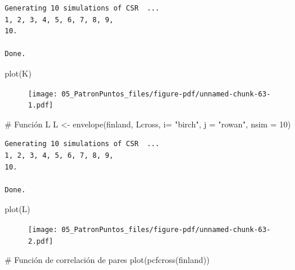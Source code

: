 \documentclass[
  letterpaper,
  DIV=11,
  numbers=noendperiod]{scrreprt}
\newenvironment{Shaded}{\begin{snugshade}}{\end{snugshade}}
\newcommand{\AttributeTok}[1]{\textcolor[rgb]{0.40,0.45,0.13}{#1}}
\newcommand{\CommentTok}[1]{\textcolor[rgb]{0.37,0.37,0.37}{#1}}
\newcommand{\DecValTok}[1]{\textcolor[rgb]{0.68,0.00,0.00}{#1}}
\newcommand{\FunctionTok}[1]{\textcolor[rgb]{0.28,0.35,0.67}{#1}}
\newcommand{\NormalTok}[1]{\textcolor[rgb]{0.00,0.23,0.31}{#1}}
\newcommand{\OtherTok}[1]{\textcolor[rgb]{0.00,0.23,0.31}{#1}}
\newcommand{\StringTok}[1]{\textcolor[rgb]{0.13,0.47,0.30}{#1}}
\begin{document}
\begin{verbatim}
Generating 10 simulations of CSR  ...
1, 2, 3, 4, 5, 6, 7, 8, 9, 
10.

Done.
\end{verbatim}

\begin{Shaded}
\begin{Highlighting}[]
\FunctionTok{plot}\NormalTok{(K)}
\end{Highlighting}
\end{Shaded}

\begin{figure}[H]

{\centering \texttt{[image: 05\_PatronPuntos\_files/figure-pdf/unnamed-chunk-63-1.pdf]}

}

\end{figure}

\begin{Shaded}
\begin{Highlighting}[]
\CommentTok{\# Función L}
\NormalTok{L }\OtherTok{\textless{}{-}} \FunctionTok{envelope}\NormalTok{(finland, Lcross, }\AttributeTok{i=} \StringTok{"birch"}\NormalTok{, }\AttributeTok{j =} \StringTok{"rowan"}\NormalTok{, }\AttributeTok{nsim =} \DecValTok{10}\NormalTok{)}
\end{Highlighting}
\end{Shaded}

\begin{verbatim}
Generating 10 simulations of CSR  ...
1, 2, 3, 4, 5, 6, 7, 8, 9, 
10.

Done.
\end{verbatim}

\begin{Shaded}
\begin{Highlighting}[]
\FunctionTok{plot}\NormalTok{(L)}
\end{Highlighting}
\end{Shaded}

\begin{figure}[H]

{\centering \texttt{[image: 05\_PatronPuntos\_files/figure-pdf/unnamed-chunk-63-2.pdf]}

}

\end{figure}

\begin{Shaded}
\begin{Highlighting}[]
\CommentTok{\# Función de correlación de pares}
\FunctionTok{plot}\NormalTok{(}\FunctionTok{pcfcross}\NormalTok{(finland))}
\end{Highlighting}
\end{Shaded}
\end{document}
